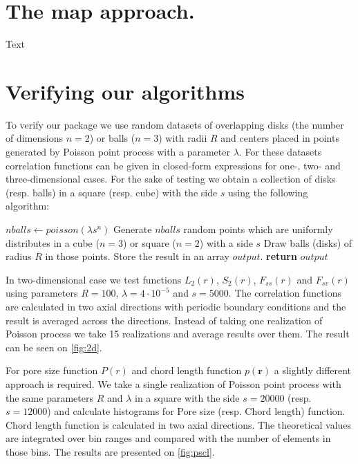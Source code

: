 \documentclass[reprint,amsmath,amssymb,aps,pre,nofootinbib]{revtex4-1}
\begin{document}
\section{The map approach.}
\label{mapsec}
Text

\section{Verifying our algorithms}
\label{verisec}
To verify our package we use random datasets of overlapping disks (the number of
dimensions $n = 2$) or balls ($n = 3$) with radii $R$ and centers placed in
points generated by Poisson point process with a parameter $\lambda$. For these
datasets correlation functions can be given in closed-form expressions for one-,
two- and three-dimensional cases. For the sake of testing we obtain a collection
of disks (resp. balls) in a square (resp. cube) with the side $s$ using the
following algorithm:
\begin{algorithmic}[1]
  \label{testdata}
    \State $nballs \gets poisson(\lambda s^n)$ 
    \State Generate $nballs$ random points which are uniformly distributes in
    a cube ($n = 3$) or square ($n = 2$) with a side $s$
    \State Draw balls (disks) of radius $R$ in those points. Store the result in
    an array $output$.
    \State \textbf{return} $output$
  \EndProcedure
\end{algorithmic}

In two-dimensional case we test functions $L_2(r)$, $S_2(r)$, $F_{ss}(r)$ and
$F_{sv}(r)$ using parameters $R = 100$, $\lambda = 4\cdot10^{-5}$ and
$s = 5000$. The correlation functions are calculated in two axial directions
with periodic boundary conditions and the result is averaged across the
directions. Instead of taking one realization of Poisson process we take 15
realizations and average results over them. The result can be seen on
\cref{fig:2d}.

For pore size function $P(r)$ and chord length function $p(\bm{r})$ a slightly
different approach is required. We take a single realization of Poisson point
process with the same parameters $R$ and $\lambda$ in a square with the side
$s = 20000$ (resp. $s = 12000$) and calculate histograms for Pore size
(resp. Chord length) function. Chord length function is calculated in two axial
directions. The theoretical values are integrated over bin ranges and compared
with the number of elements in those bins. The results are presented on
\cref{fig:pscl}.
\end{document}
